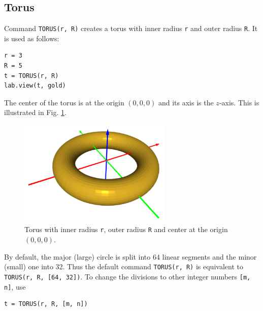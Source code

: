 \subsection{Torus}

Command {\tt TORUS(r, R)} creates a torus with inner radius {\tt r} and outer 
radius {\tt R}. It is used as follows:\\

\begin{bbox}
\begin{verbatim}
r = 3
R = 5
t = TORUS(r, R)
lab.view(t, gold)
\end{verbatim}
\end{bbox}
\vspace{6mm}

\noindent
The center of the torus is at the origin $(0, 0, 0)$ and its axis
is the $z$-axis. This is illustrated in Fig. \ref{fig:torus-1}.

\begin{figure}[!ht]
\begin{center}
\includegraphics[width=0.65\textwidth]{img/torus-1.png}
\end{center}
\vspace{-4mm}
\caption{Torus with inner radius {\tt r}, outer radius {\tt R} and center at the origin $(0, 0, 0)$.}
\label{fig:torus-1}
\end{figure}
\noindent
By default, the major (large) circle is split into 64 linear segments and
the minor (small) one into 32. Thus the default command {\tt TORUS(r, R)} is
equivalent to {\tt TORUS(r, R, [64, 32])}. To change the divisions to other 
integer numbers {\tt [m, n]}, use\\

\begin{bbox}
\begin{verbatim}
t = TORUS(r, R, [m, n])
\end{verbatim}
\end{bbox}
\vspace{6mm}

